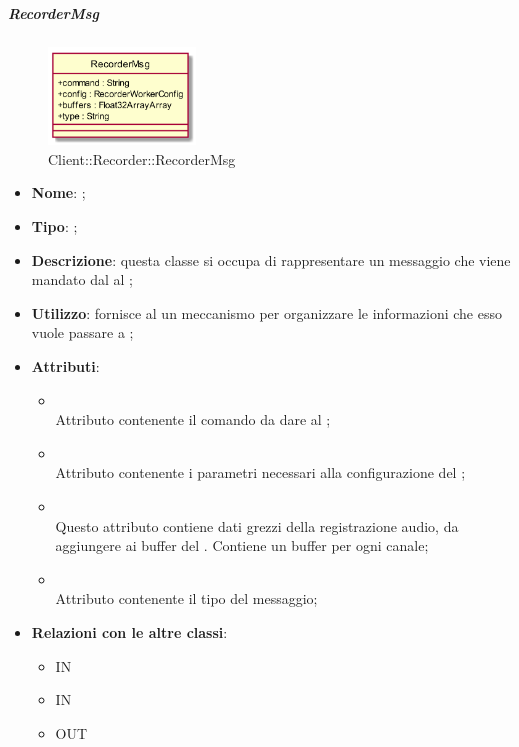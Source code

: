 \hypertarget{RecorderMsg_label}{\subparagraph{RecorderMsg}}
\begin{figure}[h]
	\centering
	\includegraphics[width=0.35\textwidth,height=\textheight,keepaspectratio]{images/ClassRecorderMsg.png}
	\caption{Client::Recorder::RecorderMsg}
\end{figure}
\begin{itemize}
	\item \textbf{Nome}: ;
	\item \textbf{Tipo}: ;
	\item \textbf{Descrizione}: questa classe si occupa di rappresentare un messaggio che viene mandato dal  al ;
	\item \textbf{Utilizzo}: fornisce al  un meccanismo per organizzare le informazioni che esso vuole passare a ;
	\item \textbf{Attributi}:
	\begin{itemize}
		\item[]  \\
		Attributo contenente il comando da dare al ;
		\item[]  \\
		Attributo contenente i parametri necessari alla configurazione del ;
		\item[]  \\
		Questo attributo contiene dati grezzi della registrazione audio, da aggiungere ai buffer del . Contiene un buffer per ogni canale;
		\item[]  \\
		Attributo contenente il tipo del messaggio;
	\end{itemize}
	\item \textbf{Relazioni con le altre classi}:
	\begin{itemize}
		\item IN \hyperlink{RecorderWorker_label}{}
		\item IN \hyperlink{Recorder_label}{}
		\item OUT \hyperlink{RecorderWorkerConfig_label}{}
	\end{itemize}
\end{itemize}
\FloatBarrier

